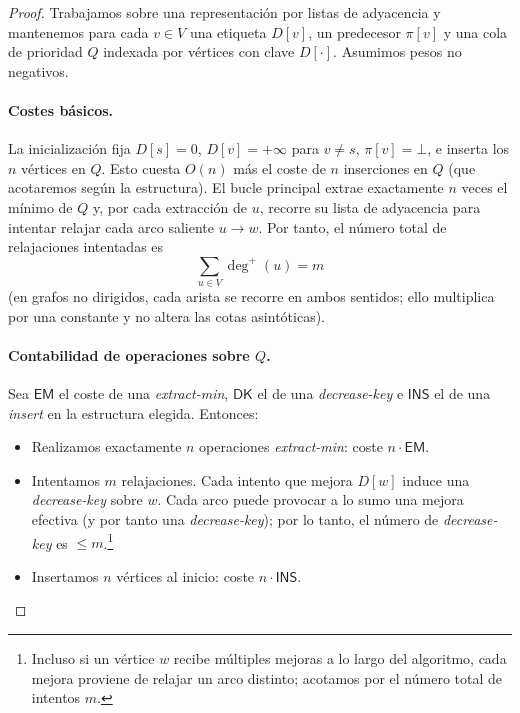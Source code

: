             \begin{proof}
                Trabajamos sobre una representación por listas de adyacencia y mantenemos para cada $v\in V$ una etiqueta $D[v]$, un predecesor $\pi[v]$ y una cola de prioridad $Q$ indexada por vértices con clave $D[\cdot]$. Asumimos pesos no negativos.

                \paragraph{Costes básicos.}
                La inicialización fija $D[s]=0$, $D[v]=+\infty$ para $v\neq s$, $\pi[v]=\bot$, e inserta los $n$ vértices en $Q$. Esto cuesta $O(n)$ más el coste de $n$ inserciones en $Q$ (que acotaremos según la estructura). El bucle principal extrae exactamente $n$ veces el mínimo de $Q$ y, por cada extracción de $u$, recorre su lista de adyacencia para intentar relajar cada arco saliente $u\to w$. Por tanto, el número total de relajaciones intentadas es
                \[
                \sum_{u\in V}\deg^+(u)=m
                \]
                (en grafos no dirigidos, cada arista se recorre en ambos sentidos; ello multiplica por una constante y no altera las cotas asintóticas).

                \paragraph{Contabilidad de operaciones sobre $Q$.}
                Sea $\mathsf{EM}$ el coste de una \emph{extract-min}, $\mathsf{DK}$ el de una \emph{decrease-key} e $\mathsf{INS}$ el de una \emph{insert} en la estructura elegida. Entonces:
                \begin{itemize}
                    \item Realizamos exactamente $n$ operaciones \emph{extract-min}: coste $n\cdot \mathsf{EM}$.
                    \item Intentamos $m$ relajaciones. Cada intento que mejora $D[w]$ induce una \emph{decrease-key} sobre $w$. Cada arco puede provocar a lo sumo una mejora efectiva (y por tanto una \emph{decrease-key}); por lo tanto, el número de \emph{decrease-key} es $\le m$.\footnote{Incluso si un vértice $w$ recibe múltiples mejoras a lo largo del algoritmo, cada mejora proviene de relajar un arco distinto; acotamos por el número total de intentos $m$.}
                    \item Insertamos $n$ vértices al inicio: coste $n\cdot \mathsf{INS}$.
                \end{itemize}


\end{proof}
